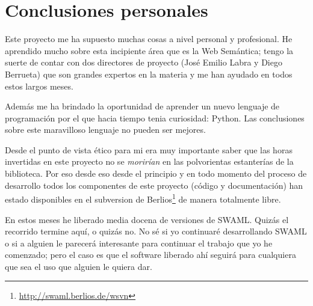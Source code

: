
\section{Conclusiones personales}

Este proyecto me ha supuesto muchas cosas a nivel personal y profesional. He
aprendido mucho sobre esta incipiente área que es la Web Semántica; tengo la
suerte de contar con dos directores de proyecto (José Emilio Labra y Diego
Berrueta) que son grandes expertos en la materia y me han ayudado en todos 
estos largos meses.

Además me ha brindado la oportunidad de aprender un nuevo lenguaje de programación 
por el que hacia tiempo tenia curiosidad: Python. Las conclusiones sobre este 
maravilloso lenguaje no pueden ser mejores.

Desde el punto de vista ético para mi era muy importante saber que las horas
invertidas en este proyecto no se \emph{morirían} en las polvorientas estanterías
de la biblioteca. Por eso desde eso desde el principio y en todo momento del
proceso de desarrollo todos los componentes de este proyecto (código y 
documentación) han estado disponibles en el subversion de 
Berlios\footnote{\url{http://swaml.berlios.de/wsvn}} de manera totalmente
libre.

En estos meses he liberado media docena de versiones de SWAML. Quizás el recorrido
termine aquí, o quizás no. No sé si yo continuaré desarrollando SWAML o si a alguien
le parecerá interesante para continuar el trabajo que yo he comenzado; pero el caso
es que el software liberado ahí seguirá para cualquiera que sea el uso que alguien
le quiera dar.
